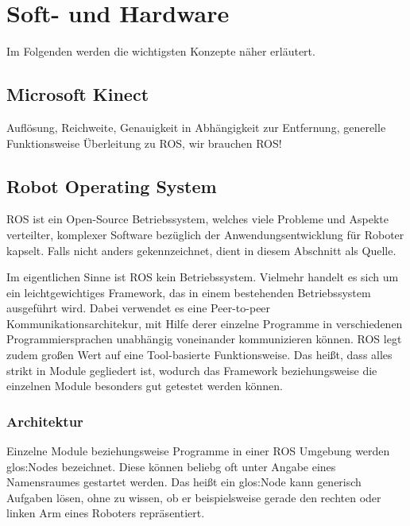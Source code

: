 \section{Soft- und Hardware}
\label{sec:softundhardware}

Im Folgenden werden die wichtigsten Konzepte näher erläutert.

\subsection{Microsoft Kinect}
{\color{red}Auflösung, Reichweite, Genauigkeit in Abhängigkeit zur Entfernung, generelle Funktionsweise} {\color{red}Überleitung zu ROS, wir brauchen ROS!}

\subsection{Robot Operating System}

\gls{ROS} ist ein Open-Source Betriebssystem, welches viele Probleme und Aspekte verteilter, komplexer Software bezüglich der Anwendungsentwicklung für Roboter kapselt. Falls nicht anders gekennzeichnet, dient \cite{Quigley:2009kx} in diesem Abschnitt als Quelle.

Im eigentlichen Sinne ist \gls{ROS} kein Betriebssystem. Vielmehr handelt es sich um ein leichtgewichtiges Framework, das in einem bestehenden Betriebssystem ausgeführt wird. Dabei verwendet es eine Peer-to-peer Kommunikationsarchitekur, mit Hilfe derer einzelne Programme in verschiedenen Programmiersprachen unabhängig voneinander kommunizieren können. \gls{ROS} legt zudem großen Wert auf eine Tool-basierte Funktionsweise. Das heißt, dass alles strikt in Module gegliedert ist, wodurch das Framework beziehungsweise die einzelnen Module besonders gut getestet werden können.

\subsubsection{Architektur}

Einzelne Module beziehungsweise Programme in einer \gls{ROS} Umgebung werden \glspl{glos:Node} bezeichnet. Diese können beliebg oft unter Angabe eines Namensraumes gestartet werden. Das heißt ein \gls{glos:Node} kann generisch Aufgaben lösen, ohne zu wissen, ob er beispielsweise gerade den rechten oder linken Arm eines Roboters repräsentiert.

